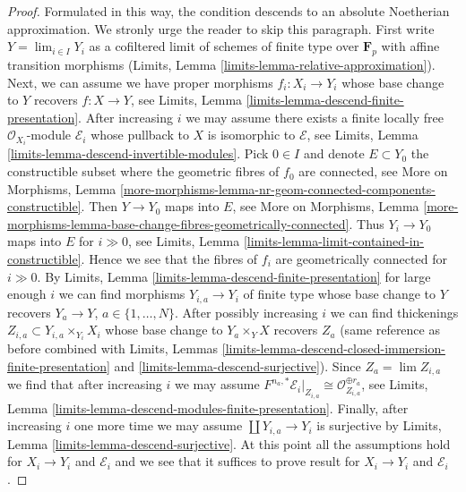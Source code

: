 \begin{proof}
\medskip\noindent
Formulated in this way, the condition descends to an absolute
Noetherian approximation. We stronly urge the reader to skip
this paragraph. First write $Y = \lim_{i \in I} Y_i$ as a cofiltered limit
of schemes of finite type over $\mathbf{F}_p$ with affine transition
morphisms (Limits, Lemma \ref{limits-lemma-relative-approximation}).
Next, we can assume we have proper morphisms $f_i : X_i \to Y_i$
whose base change to $Y$ recovers $f : X \to Y$, see
Limits, Lemma \ref{limits-lemma-descend-finite-presentation}.
After increasing $i$ we may assume there exists a finite locally
free $\mathcal{O}_{X_i}$-module $\mathcal{E}_i$ whose pullback
to $X$ is isomorphic to $\mathcal{E}$, see
Limits, Lemma \ref{limits-lemma-descend-invertible-modules}.
Pick $0 \in I$ and denote $E \subset Y_0$ the constructible subset
where the geometric fibres of $f_0$ are connected, see
More on Morphisms, Lemma
\ref{more-morphisms-lemma-nr-geom-connected-components-constructible}.
Then $Y \to Y_0$ maps into $E$, see
More on Morphisms, Lemma
\ref{more-morphisms-lemma-base-change-fibres-geometrically-connected}.
Thus $Y_i \to Y_0$ maps into $E$ for $i \gg 0$, see
Limits, Lemma \ref{limits-lemma-limit-contained-in-constructible}.
Hence we see that the fibres of $f_i$ are geometrically connected
for $i \gg 0$. By Limits, Lemma \ref{limits-lemma-descend-finite-presentation}
for large enough $i$ we can find morphisms
$Y_{i, a} \to Y_i$ of finite type whose base change to $Y$
recovers $Y_a \to Y$, $a  \in \{1, \ldots, N\}$.
After possibly increasing $i$ we can find thickenings
$Z_{i, a} \subset Y_{i, a} \times_{Y_i} X_i$ whose base change
to $Y_a \times_Y X$ recovers $Z_a$ (same reference as before
combined with
Limits, Lemmas
\ref{limits-lemma-descend-closed-immersion-finite-presentation} and
\ref{limits-lemma-descend-surjective}).
Since $Z_a = \lim Z_{i, a}$ we find that after increasing $i$ we may assume
$F^{n_a, *}\mathcal{E}_i|_{Z_{i, a}} \cong
\mathcal{O}_{Z_{i, a}}^{\oplus r_a}$, see
Limits, Lemma \ref{limits-lemma-descend-modules-finite-presentation}.
Finally, after increasing $i$ one more time we may assume
$\coprod Y_{i, a} \to Y_i$ is surjective by
Limits, Lemma \ref{limits-lemma-descend-surjective}.
At this point all the assumptions hold for $X_i \to Y_i$
and $\mathcal{E}_i$ and we see that it suffices to prove result
for $X_i \to Y_i$ and $\mathcal{E}_i$.


\end{proof}
